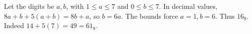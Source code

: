 Let the digits be $a,b$, with $1\le a\le7$ and $0\le b\le7$. In decimal values, $8a+b+5(a+b)=8b+a$, so $b=6a$. The bounds force $a=1,b=6$. Thus $\boxed{16_8}$. Indeed $14+5(7)=49=61_8$.
